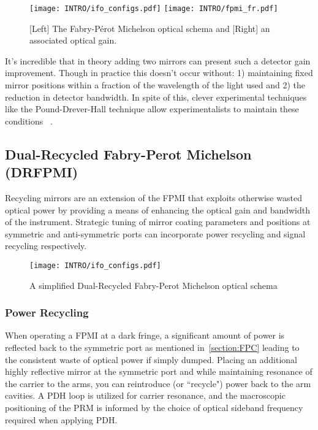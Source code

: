 {\begin{figure}[ht!]
  \begin{subcaptiongroup}{\texttt{[image: INTRO/ifo\_configs.pdf]}}
  \texttt{[image: INTRO/fpmi\_fr.pdf]}
  \end{subcaptiongroup}
  \hfill
  \caption{[Left] The Fabry-P\'{e}rot Michelson optical schema and [Right] an associated optical gain.}
  \label{fig:fpmi}
\end{figure}

It's incredible that in theory adding two mirrors can present such a detector gain improvement. Though in practice this doesn't occur without: 1) maintaining fixed mirror positions within a fraction of the wavelength of the light used and 2) the reduction in detector bandwidth. In spite of this, clever experimental techniques like the Pound-Drever-Hall technique allow experimentalists to maintain these conditions ~\cite{?}.

\subsection{Dual-Recycled Fabry-Perot Michelson (DRFPMI)}
Recycling mirrors are an extension of the FPMI that exploits otherwise wasted optical power by providing a means of enhancing the optical gain and bandwidth of the instrument. Strategic tuning of mirror coating parameters and positions at symmetric and anti-symmetric ports can incorporate power recycling and signal recycling respectively.

\begin{figure}[H]
\begin{center}
\texttt{[image: INTRO/ifo\_configs.pdf]}
\end{center}
\caption{A simplified Dual-Recycled Fabry-Perot Michelson optical schema}
\label{fig:drfp_michelson}
\end{figure}

\subsubsection{Power Recycling}
When operating a FPMI at a dark fringe, a significant amount of power is reflected back to the symmetric port as mentioned in~\ref{section:FPC} leading to the consistent waste of optical power if simply dumped. Placing an additional highly reflective mirror at the symmetric port and while maintaining resonance of the carrier to the arms, you can reintroduce (or ``recycle") power back to the arm cavities. A PDH loop is utilized for carrier resonance, and the macroscopic positioning of the PRM is informed by the choice of optical sideband frequency required when applying PDH. 

}
